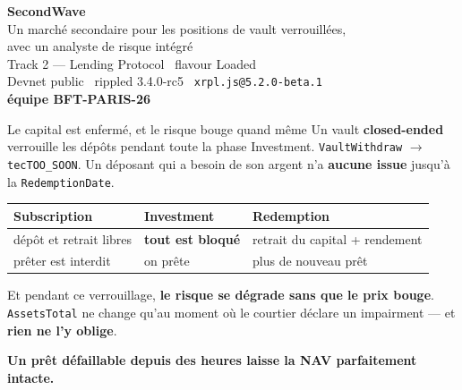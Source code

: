 \documentclass[aspectratio=169,11pt]{beamer}
\newcommand{\tc}[1]{{\small\texttt{#1}}}
\begin{document}
\begin{frame}[plain]
\vspace{1.1cm}
\begin{center}
{\Huge\bfseries SecondWave}\\[10pt]
{\large Un marché secondaire pour les positions de vault verrouillées,}\\
{\large avec un analyste de risque intégré}\\[26pt]
{\color{ink2}\small
Track 2 --- Lending Protocol \textperiodcentered\ flavour Loaded\\
Devnet public \textperiodcentered\ rippled 3.4.0-rc5 \textperiodcentered\ \tc{xrpl.js@5.2.0-beta.1}\\[8pt]
\textbf{équipe BFT-PARIS-26}}
\end{center}
\end{frame}

\begin{frame}{Le capital est enfermé, et le risque bouge quand même}
\vspace{4pt}
Un vault \textbf{closed-ended} verrouille les dépôts pendant toute la phase Investment.
\tc{VaultWithdraw} $\rightarrow$ \tc{tecTOO\_SOON}. Un déposant qui a besoin de son argent
n'a \textbf{aucune issue} jusqu'à la \tc{RedemptionDate}.
\vspace{10pt}

\begin{center}
\begin{tabular}{@{}lll@{}}
\toprule
\textbf{Subscription} & \textbf{Investment} & \textbf{Redemption}\\
\midrule
dépôt et retrait libres & \color{bad}\textbf{tout est bloqué} & retrait du capital + rendement\\
prêter est interdit & on prête & plus de nouveau prêt\\
\bottomrule
\end{tabular}
\end{center}
\vspace{10pt}

Et pendant ce verrouillage, \textbf{le risque se dégrade sans que le prix bouge}.
\tc{AssetsTotal} ne change qu'au moment où le courtier déclare un impairment --- et
\textbf{rien ne l'y oblige}.
\vspace{4pt}

{\color{bad}\textbf{Un prêt défaillable depuis des heures laisse la NAV parfaitement intacte.}}
\end{frame}
\end{document}
